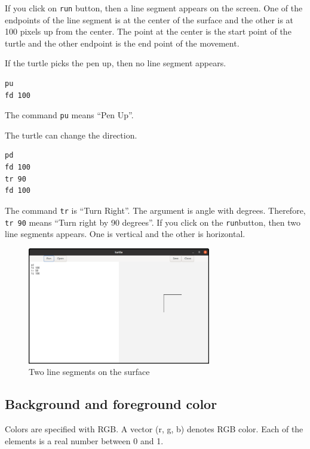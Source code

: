 If you click on \passthrough{\lstinline!run!} button, then a line
segment appears on the screen. One of the endpoints of the line segment
is at the center of the surface and the other is at 100 pixels up from
the center. The point at the center is the start point of the turtle and
the other endpoint is the end point of the movement.

If the turtle picks the pen up, then no line segment appears.

\begin{lstlisting}
pu
fd 100
\end{lstlisting}

The command \passthrough{\lstinline!pu!} means ``Pen Up''.

The turtle can change the direction.

\begin{lstlisting}
pd
fd 100
tr 90
fd 100
\end{lstlisting}

The command \passthrough{\lstinline!tr!} is ``Turn Right''. The argument
is angle with degrees. Therefore, \passthrough{\lstinline!tr 90!} means
``Turn right by 90 degrees''. If you click on the
\passthrough{\lstinline!run!}button, then two line segments appears. One
is vertical and the other is horizontal.

\begin{figure}
\centering
\includegraphics[width=8cm,height=5.11cm]{../src/turtle/image/turtle2.png}
\caption{Two line segments on the surface}
\end{figure}

\hypertarget{background-and-foreground-color}{%
\subsection{Background and foreground
color}\label{background-and-foreground-color}}

Colors are specified with RGB. A vector (r, g, b) denotes RGB color.
Each of the elements is a real number between 0 and 1.

